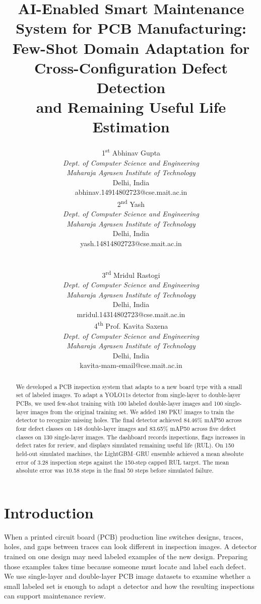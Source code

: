 \documentclass[conference]{IEEEtran}
\newcommand{\pcbAuthor}[2]{%
  \begin{minipage}[t]{.46\textwidth}
    \centering
    {\normalsize #1\par}
    {\small\itshape Dept. of Computer Science and Engineering\\
      Maharaja Agrasen Institute of Technology\par}
    {\small Delhi, India\\#2\par}
  \end{minipage}}
\begin{document}
\title{AI-Enabled Smart Maintenance System for PCB Manufacturing:\\
Few-Shot Domain Adaptation for Cross-Configuration Defect Detection\\
and Remaining Useful Life Estimation}
\author{%
\pcbAuthor{1\textsuperscript{st} Abhinav Gupta}{abhinav.14914802723@cse.mait.ac.in}
\hspace{.03\textwidth}%
\pcbAuthor{2\textsuperscript{nd} Yash}{yash.14814802723@cse.mait.ac.in}\\[1ex]
\pcbAuthor{3\textsuperscript{rd} Mridul Rastogi}{mridul.14314802723@cse.mait.ac.in}
\hspace{.03\textwidth}%
\pcbAuthor{4\textsuperscript{th} Prof. Kavita Saxena}{kavita-mam-email@cse.mait.ac.in}%
}
\maketitle

\begin{abstract}

We developed a PCB inspection system that adapts to a new board type with a small set of labeled images. To adapt a YOLO11s detector from single-layer to double-layer PCBs, we used few-shot training with 100 labeled double-layer images and 100 single-layer images from the original training set. We added 180 PKU images to train the detector to recognize missing holes. The final detector achieved 84.46\% mAP50 across four defect classes on 148 double-layer images and 83.65\% mAP50 across five defect classes on 130 single-layer images. The dashboard records inspections, flags increases in defect rates for review, and displays simulated remaining useful life (RUL). On 150 held-out simulated machines, the LightGBM–GRU ensemble achieved a mean absolute error of 3.28 inspection steps against the 150-step capped RUL target. The mean absolute error was 10.58 steps in the final 50 steps before simulated failure.

\end{abstract}

\section{Introduction}

When a printed circuit board (PCB) production line switches designs, traces, holes, and gaps between traces can look different in inspection images. A detector trained on one design may need labeled examples of the new design. Preparing those examples takes time because someone must locate and label each defect. We use single-layer and double-layer PCB image datasets to examine whether a small labeled set is enough to adapt a detector and how the resulting inspections can support maintenance review.
\end{document}
